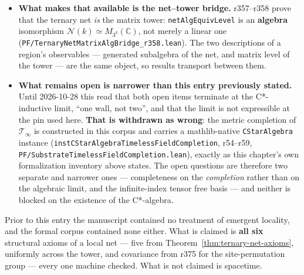 \begin{itemize}
\emph{finite} site set $\mathrm{Fin}\,k$: the substrate is exhausted by the local
algebras of finite regions, which is completeness in the inductive-limit sense.
The step is that $\mathcal{T}_\infty$ is a quotient of $\Sigma_k\, M_{3^k}$, so
every element already lives at a finite stage, where the finite-$\iota$ case of
Theorem~\ref{thm:ternary-net-axioms} applies. r359 carries a
\texttt{scope\_tensor\_carrier\_untouched} marker to record that it does
\emph{not} settle the tensor-carrier question, and it must not be cited as
doing so.
\item \textbf{What makes that available is the net--tower bridge.} r357--r358
prove that the ternary net \emph{is} the matrix tower: \texttt{netAlgEquivLevel}
is an \textbf{algebra} isomorphism $\mathcal{N}(k) \simeq M_{3^k}(\mathbb{C})$,
not merely a linear one (\texttt{PF/TernaryNetMatrixAlgBridge\_r358.lean}). The
two descriptions of a region's observables --- generated subalgebra of the net,
and matrix level of the tower --- are the same object, so results transport
between them.
\item \textbf{What remains open is narrower than this entry previously
stated.} Until 2026-10-28 this read that both open items terminate at the
C*-inductive limit, ``one wall, not two'', and that the limit is not
expressible at the pin used here. \textbf{That is withdrawn as wrong}: the
metric completion of $\mathcal{T}_\infty$ is constructed in this corpus and
carries a mathlib-native \texttt{CStarAlgebra} instance
(\texttt{instCStarAlgebraTimelessFieldCompletion}, r54--r59,
\texttt{PF/SubstrateTimelessFieldCompletion.lean}), exactly as this chapter's
own formalization inventory above states. The open questions are therefore two
separate and narrower ones --- completeness on the \emph{completion} rather
than on the algebraic limit, and the infinite-index tensor free basis --- and
neither is blocked on the existence of the C*-algebra.
\end{itemize}

\noindent Prior to this entry the manuscript contained no treatment of emergent
locality, and the formal corpus contained none either. What is claimed is
\textbf{all six} structural axioms of a local net --- five from
Theorem~\ref{thm:ternary-net-axioms}, uniformly across the tower, and
covariance from r375 for the site-permutation group --- every one machine
checked. What is not claimed is spacetime.

